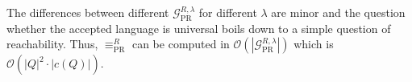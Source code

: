 The differences between different $\mathcal{G}_\text{PR}^{R,\lambda}$ for different $\lambda$ are minor and the question whether the accepted language is universal boils down to a simple question of reachability. Thus, $\equiv_\text{PR}^R$ can be computed in $\mathcal{O}(|\mathcal{G}_\text{PR}^{R,\lambda}|)$ which is $\mathcal{O}(|Q|^2 \cdot |c(Q)|)$.






















